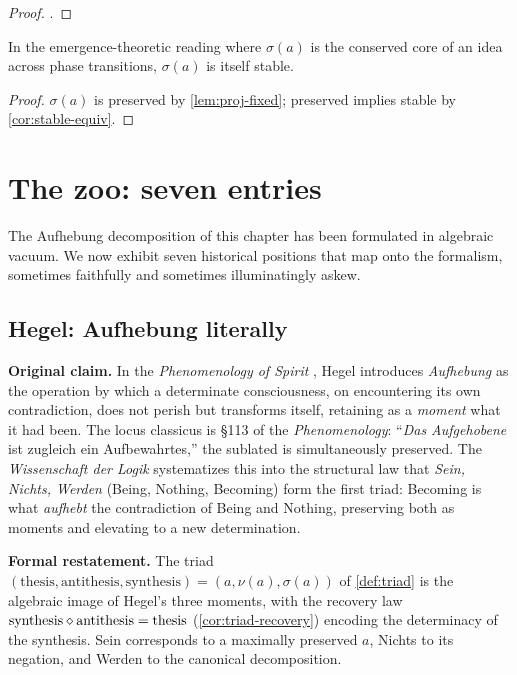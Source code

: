 \begin{proof}
.
\end{proof}

\begin{corollary}\label{cor:emergence}
In the emergence-theoretic reading where $\sigma(a)$ is the
conserved core of an idea across phase transitions, $\sigma(a)$ is
itself stable.
\end{corollary}

\begin{proof}
$\sigma(a)$ is preserved by \cref{lem:proj-fixed}; preserved
implies stable by \cref{cor:stable-equiv}.
\end{proof}

\section{The zoo: seven entries}\label{sec:aufheb-zoo}

The Aufhebung decomposition of this chapter has been formulated in
algebraic vacuum. We now exhibit seven historical positions that map
onto the formalism, sometimes faithfully and sometimes
illuminatingly askew.

\subsection*{Hegel: Aufhebung literally}

\textbf{Original claim.} In the \emph{Phenomenology of Spirit}
\citep{Hegel1807}, Hegel introduces \emph{Aufhebung} as the operation
by which a determinate consciousness, on encountering its own
contradiction, does not perish but transforms itself, retaining as a
\emph{moment} what it had been. The locus classicus is \S113 of the
\emph{Phenomenology}: ``\emph{Das Aufgehobene} ist zugleich ein
Aufbewahrtes,'' the sublated is simultaneously preserved. The
\emph{Wissenschaft der Logik} \citep[\S185--\S190]{Hegel1812} systematizes
this into the structural law that \emph{Sein, Nichts, Werden} (Being,
Nothing, Becoming) form the first triad: Becoming is what
\emph{aufhebt} the contradiction of Being and Nothing, preserving
both as moments and elevating to a new determination.

\textbf{Formal restatement.} The triad
$(\mathrm{thesis},\mathrm{antithesis},\mathrm{synthesis})=(a,\nu(a),\sigma(a))$ of
\cref{def:triad} is the algebraic image of Hegel's three moments,
with the recovery law
$\mathrm{synthesis}\mathbin{\diamond}\mathrm{antithesis}=\mathrm{thesis}$ (\cref{cor:triad-recovery})
encoding the determinacy of the synthesis. Sein corresponds to a
maximally preserved $a$, Nichts to its negation, and Werden to the
canonical decomposition.

